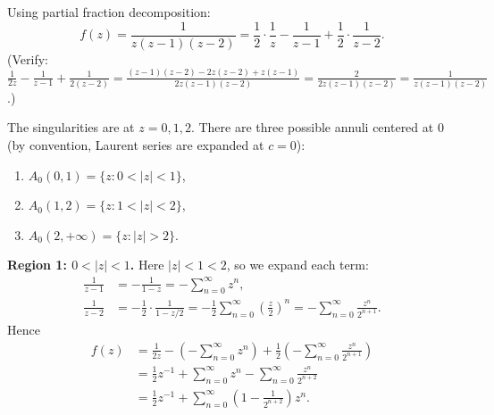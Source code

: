 \documentclass{article}
\begin{document}
\begin{solution}
  Using partial fraction decomposition:
  \[
    f(z) = \frac{1}{z(z-1)(z-2)} = \frac{1}{2} \cdot \frac{1}{z}
    - \frac{1}{z-1} + \frac{1}{2} \cdot \frac{1}{z-2}.
  \]
  (Verify: $\frac{1}{2z} - \frac{1}{z-1} + \frac{1}{2(z-2)}
  = \frac{(z-1)(z-2) - 2z(z-2) + z(z-1)}{2z(z-1)(z-2)}
  = \frac{2}{2z(z-1)(z-2)} = \frac{1}{z(z-1)(z-2)}$.)

  The singularities are at $z = 0, 1, 2$. There are three possible annuli
  centered at $0$ (by convention, Laurent series are expanded at $c = 0$):
  \begin{enumerate}
    \item $A_0(0, 1) = \{z : 0 < |z| < 1\}$,
    \item $A_0(1, 2) = \{z : 1 < |z| < 2\}$,
    \item $A_0(2, +\infty) = \{z : |z| > 2\}$.
  \end{enumerate}

  \medskip
  \noindent\textbf{Region 1: $0 < |z| < 1$.}
  Here $|z| < 1 < 2$, so we expand each term:
  \begin{align*}
    \frac{1}{z-1} &= -\frac{1}{1-z} = -\sum_{n=0}^{\infty} z^n,\\
    \frac{1}{z-2} &= -\frac{1}{2} \cdot \frac{1}{1 - z/2}
    = -\frac{1}{2} \sum_{n=0}^{\infty} \left(\frac{z}{2}\right)^n
    = -\sum_{n=0}^{\infty} \frac{z^n}{2^{n+1}}.
  \end{align*}
  Hence
  \begin{align*}
    f(z) &= \frac{1}{2z} - \left(-\sum_{n=0}^{\infty} z^n\right)
    + \frac{1}{2}\left(-\sum_{n=0}^{\infty} \frac{z^n}{2^{n+1}}\right)\\
    &= \frac{1}{2} z^{-1} + \sum_{n=0}^{\infty} z^n
    - \sum_{n=0}^{\infty} \frac{z^n}{2^{n+2}}\\
    &= \frac{1}{2} z^{-1} + \sum_{n=0}^{\infty}
    \left(1 - \frac{1}{2^{n+2}}\right) z^n.
  \end{align*}


\end{solution}
\end{document}
